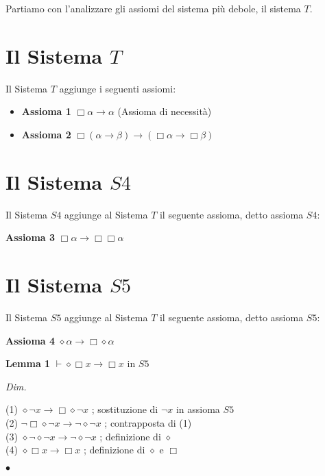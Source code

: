 \documentclass[a4paper, 12pt]{article}
\begin{document}
Partiamo con l'analizzare gli assiomi del sistema più debole, il sistema $T$.

\section{Il Sistema $T$}
Il Sistema $T$ aggiunge i seguenti assiomi:
\begin{itemize}
\item \textbf{Assioma 1} $\Box \alpha \rightarrow \alpha$ (Assioma di necessità)
\item \textbf{Assioma 2} $\Box (\alpha \rightarrow \beta) \rightarrow (\Box \alpha \rightarrow \Box \beta)$
\end{itemize}

\section{Il Sistema $S4$}
Il Sistema $S4$ aggiunge al Sistema $T$ il seguente assioma, detto assioma $S4$:

\textbf{Assioma 3} $\Box \alpha \rightarrow \Box \Box \alpha$

\section{Il Sistema $S5$}
Il Sistema $S5$ aggiunge al Sistema $T$ il seguente assioma, detto assioma $S5$:

\textbf{Assioma 4} $\diamond \alpha \rightarrow \Box \diamond \alpha$

\begin{flushleft}
\textbf{Lemma 1}
$\vdash \diamond \Box x \rightarrow \Box x$ in $S5$

\textit{Dim.}

(1) $\diamond \neg x \rightarrow \Box \diamond \neg x$ ; sostituzione di $\neg x$ in assioma $S5$ \\
(2) $\neg \Box \diamond \neg x \rightarrow \neg \diamond \neg x$ ; contrapposta di (1) \\
(3) $\diamond \neg \diamond \neg x \rightarrow \neg \diamond \neg x$ ; definizione di $\diamond$ \\
(4) $\diamond \Box x \rightarrow \Box x$ ; definizione di $\diamond$ e $\Box$

\begin{flushright}
$\bullet$
\end{flushright}
\end{flushleft}
\end{document}
